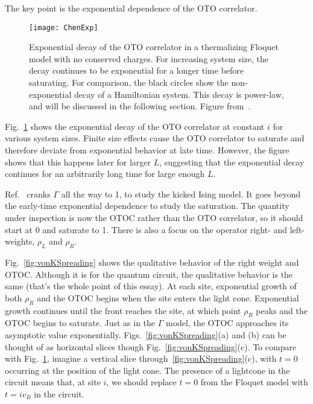 \documentclass[a4paper,11pt]{article}
\begin{document}
The key point is the exponential dependence of the OTO correlator. 
\begin{figure}
	\centering
	\texttt{[image: ChenExp]}
	\caption{Exponential decay of the OTO correlator in a thermalizing Floquet model with no conserved charges. For increasing system size, the decay continues to be exponential for a longer time before saturating. For comparison, the black circles show the non-exponential decay of a Hamiltonian system. This decay is power-law, and will be discussed in the following section. Figure from~\cite{ChenOtoc}.}
	\label{fig:ChenExp}
\end{figure}
Fig.~\ref{fig:ChenExp} shows the exponential decay of the OTO correlator at constant $i$ for various system sizes. Finite size effects cause the OTO correlator to saturate and therefore deviate from exponential behavior at late time. However, the figure shows that this happens later for larger $L$, suggesting that the exponential decay continues for an arbitrarily long time for large enough $L$.

Ref.~\cite{vonKeyserlingkHydro} cranks $\Gamma$ all the way to 1, to study the kicked Ising model. It goes beyond the early-time exponential dependence to study the saturation. The quantity under inspection is now the OTOC rather than the OTO correlator, so it should start at 0 and saturate to 1. There is also a focus on the operator right- and left-weights, $\rho_L$ and $\rho_R$.

Fig.~\ref{fig:vonKSpreading} shows the qualitative behavior of the right weight and OTOC. Although it is for the quantum circuit, the qualitative behavior is the same (that's the whole point of this essay). At each site, exponential growth of both $\rho_R$ and the OTOC begins when the site enters the light cone. Exponential growth continues until the front reaches the site, at which point $\rho_R$ peaks and the OTOC begins to saturate. Just as in the $\Gamma$ model, the OTOC approaches its asymptotic value exponentially. 
Figs.~\ref{fig:vonKSpreading}(a) and (b) can be thought of as horizontal slices though Fig.~\ref{fig:vonKSpreading}(c). To compare with Fig.~\ref{fig:ChenExp}, imagine a vertical slice through~\ref{fig:vonKSpreading}(c), with $t=0$ occurring at the position of the light cone. The presence of a lightcone in the circuit means that, at site $i$, we should replace $t=0$ from the Floquet model with $t=iv_B$ in the circuit. 
\end{document}

